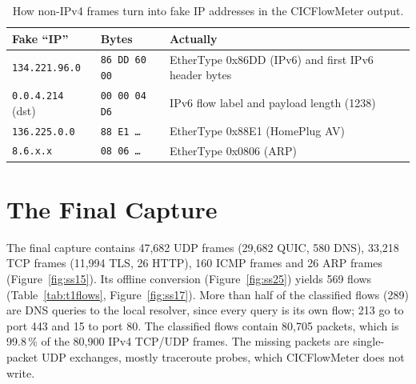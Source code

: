 \begin{table}[ht]
	\centering\small
	\begin{tabular}{llp{7.5cm}}
		\toprule
		Fake ``IP'' & Bytes & Actually \\
		\midrule
		\texttt{134.221.96.0} & \texttt{86 DD 60 00} & EtherType 0x86DD (IPv6) and first IPv6 header bytes \\
		\texttt{0.0.4.214} (dst) & \texttt{00 00 04 D6} & IPv6 flow label and payload length (1238) \\
		\texttt{136.225.0.0} & \texttt{88 E1 \ldots} & EtherType 0x88E1 (HomePlug AV) \\
		\texttt{8.6.x.x} & \texttt{08 06 \ldots} & EtherType 0x0806 (ARP) \\
		\bottomrule
	\end{tabular}
	\caption{How non-IPv4 frames turn into fake IP addresses in the CICFlowMeter output.}
	\label{tab:fakeip}
\end{table}

\section{The Final Capture}\label{sec:final-capture}


The final capture contains 47,682 UDP frames (29,682 QUIC, 580 DNS), 33,218 TCP frames (11,994 TLS, 26 HTTP), 160 ICMP frames and 26 ARP frames (Figure~\ref{fig:ss15}). Its offline conversion (Figure~\ref{fig:ss25}) yields 569 flows (Table~\ref{tab:t1flows}, Figure~\ref{fig:ss17}). More than half of the classified flows (289) are DNS queries to the local resolver, since every query is its own flow; 213 go to port 443 and 15 to port 80. The classified flows contain 80,705 packets, which is 99.8\,\% of the 80,900 IPv4 TCP/UDP frames. The missing packets are single-packet UDP exchanges, mostly traceroute probes, which CICFlowMeter does not write.

\begin{table}[ht]
	\centering\small
	
	\caption{Flows of \texttt{task2\_lab2.pcap\_Flow.csv}. The 22 flows with protocol 0 are not TCP/UDP flows and are dropped before classification.}
	\label{tab:t1flows}
\end{table}

